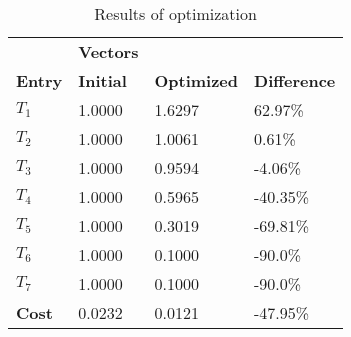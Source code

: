 \begin{table}[H]
\centering
\begin{tabular}{llll}
\textbf{}      & \cellcolor[HTML]{EFEFEF}\textbf{Vectors} & \textbf{} & \textbf{}         \\
\rowcolor[HTML]{EFEFEF} 
\textbf{Entry} & \textbf{Initial} & \textbf{Optimized} & \textbf{Difference} \\
$T_1$ & 1.0000 & 1.6297 & 62.97\% \\ 
$T_2$ & 1.0000 & 1.0061 & 0.61\% \\ 
$T_3$ & 1.0000 & 0.9594 & -4.06\% \\ 
$T_4$ & 1.0000 & 0.5965 & -40.35\% \\ 
$T_5$ & 1.0000 & 0.3019 & -69.81\% \\ 
$T_6$ & 1.0000 & 0.1000 & -90.0\% \\ 
$T_7$ & 1.0000 & 0.1000 & -90.0\% \\ 
\rowcolor[HTML]{EFEFEF} 
\textbf{Cost}  & 0.0232 & 0.0121 & -47.95\% \\ 
\end{tabular}
\caption{Results of optimization}
\label{tab:OptimizationAnalysis}
\end{table}